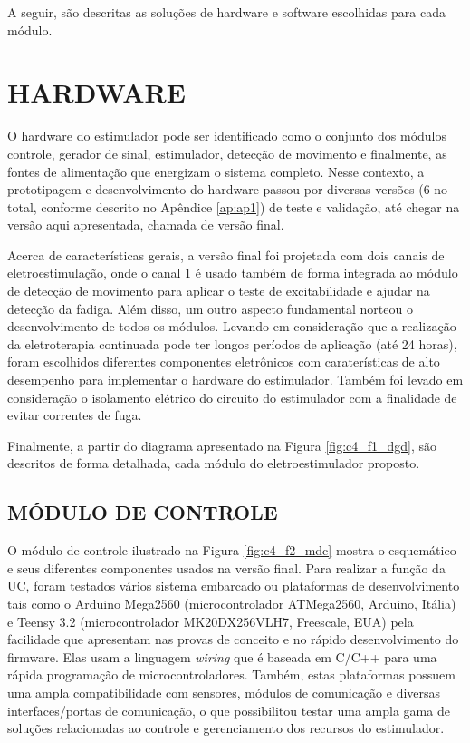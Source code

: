 A seguir, são descritas as soluções de hardware e software escolhidas para cada módulo.

\section{HARDWARE}
O hardware do estimulador pode ser identificado como o conjunto dos módulos controle, gerador de sinal, estimulador, detecção de movimento e finalmente, as fontes de alimentação que energizam o sistema completo. Nesse contexto, a prototipagem e desenvolvimento do hardware passou por diversas versões (6 no total, conforme descrito no Apêndice \ref{ap:ap1}) de teste e validação, até chegar na versão aqui apresentada, chamada de versão final. 

Acerca de características gerais, a versão final foi projetada com dois canais de eletroestimulação, onde o canal 1 é usado também de forma integrada ao módulo de detecção de movimento para aplicar o teste de excitabilidade e ajudar na detecção da fadiga. Além disso, um outro aspecto fundamental norteou o desenvolvimento de todos os módulos. Levando em consideração que a realização da eletroterapia continuada pode ter longos períodos de aplicação (até 24 horas), foram escolhidos diferentes componentes eletrônicos com caraterísticas de alto desempenho para implementar o hardware do estimulador. Também foi levado em consideração o isolamento elétrico do circuito do estimulador com a finalidade de evitar correntes de fuga. 

Finalmente, a partir do diagrama apresentado na Figura \ref{fig:c4_f1_dgd}, são descritos de forma detalhada, cada módulo do eletroestimulador proposto.

\subsection{MÓDULO DE CONTROLE}
O módulo de controle ilustrado na Figura \ref{fig:c4_f2_mdc} mostra o esquemático e seus diferentes componentes usados na versão final. Para realizar a função da \acrshort{UC}, foram testados vários sistema embarcado ou plataformas de desenvolvimento tais como o Arduino Mega2560 (microcontrolador ATMega2560, Arduino, Itália) e Teensy 3.2 (microcontrolador MK20DX256VLH7, Freescale, EUA) pela facilidade que apresentam nas provas de conceito e no rápido desenvolvimento do firmware. Elas usam a linguagem \textit{wiring} que é baseada em C/C++ para uma rápida programação de microcontroladores. Também, estas plataformas possuem uma ampla compatibilidade com sensores, módulos de comunicação e diversas interfaces/portas de comunicação, o que possibilitou testar uma ampla gama de soluções relacionadas ao controle e gerenciamento dos recursos do estimulador.

